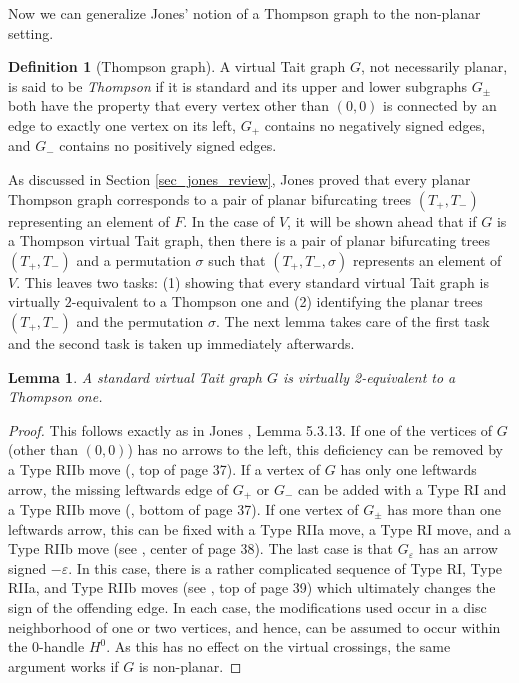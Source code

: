 \documentclass[11pt, twoside]{amsart}
\numberwithin{equation}{section}
\newtheorem{lemma}[theorem]{Lemma}
\theoremstyle{definition}
\newtheorem{definition}[theorem]{Definition}
\numberwithin{equation}{section}
\begin{document}
Now we can generalize Jones' notion of a Thompson graph to the non-planar setting.
\begin{definition}[Thompson graph] \label{def_thompson} A virtual Tait graph $G$, not necessarily planar, is said to be \emph{Thompson} if it is standard and its upper and lower subgraphs $G_{\pm}$ both have the property that every vertex other than $(0,0)$ is connected by an edge to exactly one vertex on its left, $G_{+}$ contains no negatively signed edges, and $G_{-}$ contains no positively signed edges. \end{definition}

As discussed in Section \ref{sec_jones_review}, Jones proved that every planar Thompson graph corresponds to a pair of planar bifurcating trees $(T_+,T_-)$ representing an element of $F$. In the case of $V$, it will be shown ahead that if $G$ is a Thompson virtual Tait graph, then there is a pair of planar bifurcating trees $(T_+,T_-)$ and a permutation $\sigma$ such that $(T_+,T_-,\sigma)$ represents an element of $V$. This leaves two tasks: (1) showing that every standard virtual Tait graph is virtually $2$-equivalent to a Thompson one and (2) identifying the planar trees $(T_+,T_-)$ and the permutation $\sigma$. The next lemma takes care of the first task and the second task is taken up immediately afterwards.
\begin{lemma} \label{lemma_virtual_thompson} A standard virtual Tait graph $G$ is virtually 2-equivalent to a Thompson one. 
\end{lemma}

\begin{proof} This follows exactly as in Jones \cite{jones_unitary}, Lemma 5.3.13. If one of the vertices of $G$ (other than $(0,0)$) has no arrows to the left, this deficiency can be removed by a Type RIIb move (\cite{jones_unitary}, top of page 37). If a vertex of $G$ has only one leftwards arrow, the missing leftwards edge of $G_+$ or $G_-$ can be added with a Type RI and a Type RIIb move (\cite{jones_unitary}, bottom of page 37). If one vertex of $G_{\pm}$ has more than one leftwards arrow, this can be fixed with a Type RIIa move, a Type RI move, and a Type RIIb move (see \cite{jones_unitary}, center of page 38). The last case is that $G_{\varepsilon}$ has an arrow signed $-\varepsilon$. In this case, there is a rather complicated sequence of Type RI, Type RIIa, and Type RIIb moves (see \cite{jones_unitary}, top of page 39) which ultimately changes the sign of the offending edge. In each case, the modifications used occur in a disc neighborhood of one or two vertices, and hence, can be assumed to occur within the $0$-handle $H^0$. As this has no effect on the virtual crossings, the same argument works if $G$ is non-planar.  \end{proof}
\end{document}
